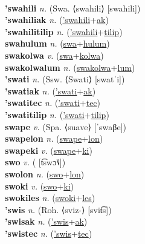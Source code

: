  \label{'swanatilip} \\
\textbf{'swahili} \textit{n.} (Swa. ⟨swahili⟩ [swahili])
 \label{'swahili} \\
\textbf{'swahiliak} \textit{n.} (\hyperref['swahili]{'swahili}+\hyperref[ak]{ak})
 \label{'swahiliak} \\
\textbf{'swahilitilip} \textit{n.} (\hyperref['swahili]{'swahili}+\hyperref[tilip]{tilip})
 \label{'swahilitilip} \\
\textbf{swahulum} \textit{n.} (\hyperref[swa]{swa}+\hyperref[hulum]{hulum})
 \label{swahulum} \\
\textbf{swakolwa} \textit{v.} (\hyperref[swa]{swa}+\hyperref[kolwa]{kolwa})
 \label{swakolwa} \\
\textbf{swakolwalum} \textit{n.} (\hyperref[swakolwa]{swakolwa}+\hyperref[lum]{lum})
 \label{swakolwalum} \\
\textbf{'swati} \textit{n.} (Ssw. ⟨Swati⟩ [swatˈi])
 \label{'swati} \\
\textbf{'swatiak} \textit{n.} (\hyperref['swati]{'swati}+\hyperref[ak]{ak})
 \label{'swatiak} \\
\textbf{'swatitec} \textit{n.} (\hyperref['swati]{'swati}+\hyperref[tec]{tec})
 \label{'swatitec} \\
\textbf{'swatitilip} \textit{n.} (\hyperref['swati]{'swati}+\hyperref[tilip]{tilip})
 \label{'swatitilip} \\
\textbf{swape} \textit{v.} (Spa. ⟨suave⟩ [ˈswaβe])
 \label{swape} \\
\textbf{swapelon} \textit{n.} (\hyperref[swape]{swape}+\hyperref[lon]{lon})
 \label{swapelon} \\
\textbf{swapeki} \textit{v.} (\hyperref[swape]{swape}+\hyperref[ki]{ki})
 \label{swapeki} \\
\textbf{swo} \textit{v.} ( [t͡swɔ˥˩])
 \label{swo} \\
\textbf{swolon} \textit{n.} (\hyperref[swo]{swo}+\hyperref[lon]{lon})
 \label{swolon} \\
\textbf{swoki} \textit{v.} (\hyperref[swo]{swo}+\hyperref[ki]{ki})
 \label{swoki} \\
\textbf{swokiles} \textit{n.} (\hyperref[swoki]{swoki}+\hyperref[les]{les})
 \label{swokiles} \\
\textbf{'swis} \textit{n.} (Roh. ⟨sviz-⟩ [svit͡s])
 \label{'swis} \\
\textbf{'swisak} \textit{n.} (\hyperref['swis]{'swis}+\hyperref[ak]{ak})
 \label{'swisak} \\
\textbf{'swistec} \textit{n.} (\hyperref['swis]{'swis}+\hyperref[tec]{tec})
 \label{'swistec} 

